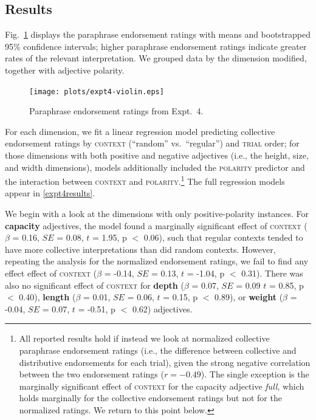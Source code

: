 \documentclass[preprint,12pt,authoryear,titlepage]{elsarticle}
\newcommand{\ndg}[1]{\textcolor{Green}{[ndg: #1]}}
\begin{document}
\subsection{Results}

Fig.\ \ref{resultsexpt4} displays the paraphrase endorsement ratings with means and bootstrapped 95\% confidence intervals; higher paraphrase endorsement ratings indicate greater rates of the relevant interpretation. We grouped data by the dimension modified, together with adjective polarity.


\begin{figure}[h]
	\centering
	\texttt{[image: plots/expt4-violin.eps]} 
	\vspace{-35pt}
	\caption{Paraphrase endorsement ratings from Expt.~4.}\label{resultsexpt4}
\end{figure}

For each dimension, we fit a linear regression model predicting collective endorsement ratings by \textsc{context} (``random'' vs.~``regular'') and \textsc{trial} order; for those dimensions with both positive and negative adjectives (i.e., the height, size, and width dimensions), models additionally included the \textsc{polarity} predictor and the interaction between \textsc{context} and \textsc{polarity}.\footnote{All reported results hold if instead we look at normalized collective paraphrase endorsement ratings (i.e., the difference between collective and distributive endorsements for each trial), given the strong negative correlation between the two endorsement ratings ($r=-0.49$). The single exception is the marginally significant effect of \textsc{context} for the capacity adjective \emph{full}, which holds marginally for the collective endorsement ratings but not for the normalized ratings. We return to this point below.} The full regression models appear in \ref{expt4results}.

We begin with a look at the dimensions with only positive-polarity instances. For \textbf{capacity} adjectives, the model found a marginally significant effect of \textsc{context} ($\beta$ = 0.16, $SE$ = 0.08, $t$ = 1.95, p $<$ 0.06), such that regular contexts tended to have more collective interpretations than did random contexts. However, repeating the analysis for the normalized endorsement ratings, we fail to find any effect effect of \textsc{context} ($\beta$ = -0.14, $SE$ = 0.13, $t$ = -1.04, p $<$ 0.31). There was also no significant effect of \textsc{context} for \textbf{depth} ($\beta$ = 0.07, $SE$ = 0.09 $t$ = 0.85, p $<$ 0.40), \textbf{length} ($\beta$ = 0.01, $SE$ = 0.06, $t$ = 0.15, p $<$ 0.89), or \textbf{weight} ($\beta$ = -0.04, $SE$ = 0.07, $t$ = -0.51, p $<$ 0.62) adjectives.
\end{document}

